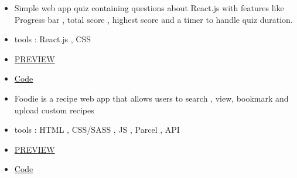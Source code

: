 


\makecvheader





\begin{paracol}{2}


\begin{itemize}
\item Simple web app quiz containing questions about React.js with features like Progress bar , total score , highest score and a timer to handle quiz duration.
\item tools : React.js , CSS
\item \href{https://nevo-react-quiz.vercel.app/}{\faGlobe \hspace{0.01cm} PREVIEW} 
\item \href{https://github.com/iknevo/react-quiz}{\faCode \hspace{0.01cm} Code }


\end{itemize}

\divider

\begin{itemize}
\item Foodie is a recipe web app that allows users to search , view, bookmark and upload custom recipes
\item tools : HTML , CSS/SASS , JS , Parcel , API
\item \href{https://nevo-foodie.vercel.app/}{\faGlobe \hspace{0.01cm} PREVIEW} 
\item \href{https://github.com/iknevo/foodie}{\faCode \hspace{0.01cm} Code }


\end{itemize}


\end{paracol}
